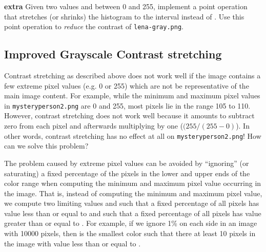 \documentclass{book}
\begin{document}
\begin{exercise}
\textbf{extra} Given two values  and  between 0 and 255, implement a point operation that stretches (or shrinks) the histogram to the interval  instead of . Use this point operation to \emph{reduce} the contrast of \texttt{lena-gray.png}.
\end{exercise}

\subsection*{Improved Grayscale Contrast stretching}
Contrast stretching as described above does not work well if the image contains a few extreme pixel values (e.g. 0 or 255) which are not be representative of the main image content. For example, while the minimum and maximum pixel values in \texttt{mysteryperson2.png} are 0 and 255, most pixels lie in the range 105 to 110. However, contrast stretching does not work well because it amounts to subtract zero from each pixel and afterwards multiplying by one ($(255 / (255 - 0)$). In other words, contrast stretching has no effect at all on \texttt{mysteryperson2.png}! How can we solve this problem?

The problem caused by extreme pixel values can be avoided by ``ignoring'' (or saturating) a fixed percentage of the pixels in the lower and upper ends of the color range when computing the minimum and maximum pixel value occurring in the image. That is, instead of computing the minimum and maximum pixel value, we compute two limiting values  and  such that a fixed percentage of all pixels has value less than or equal to  and such that a fixed percentage of all pixels has value greater than or equal to .  For example, if we ignore 1\% on each side in an image with 10000 pixels, then  is the smallest color such that there at least 10 pixels in the image with value less than or equal to . 
\end{document}
